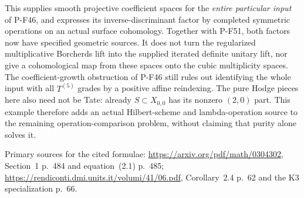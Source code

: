 This supplies smooth projective coefficient spaces
for the \emph{entire particular input} of P-F46,
and expresses its inverse-discriminant factor by
completed symmetric operations on an actual
surface cohomology. Together with P-F51, both
factors now have specified geometric sources.
It does not turn the regularized multiplicative
Borcherds lift into the supplied iterated definite
unitary lift, nor give a cohomological map from
these spaces onto the cubic multiplicity spaces.
The coefficient-growth obstruction of P-F46 still
rules out identifying the whole input with all
$T^{(5)}$ grades by a positive affine reindexing.
The pure Hodge pieces here also need not be Tate:
already $S\subset X_{0,0}$ has its nonzero
$(2,0)$ part. This example therefore adds an
actual Hilbert-scheme and lambda-operation source
to the remaining operation-comparison problem,
without claiming that purity alone solves it.

Primary sources for the cited formulae:
\url{https://arxiv.org/pdf/math/0304302},
Section~1 p.~484 and equation~(2.1) p.~485;
\url{https://rendiconti.dmi.units.it/volumi/41/06.pdf},
Corollary~2.4 p.~62 and the K3 specialization p.~66.

